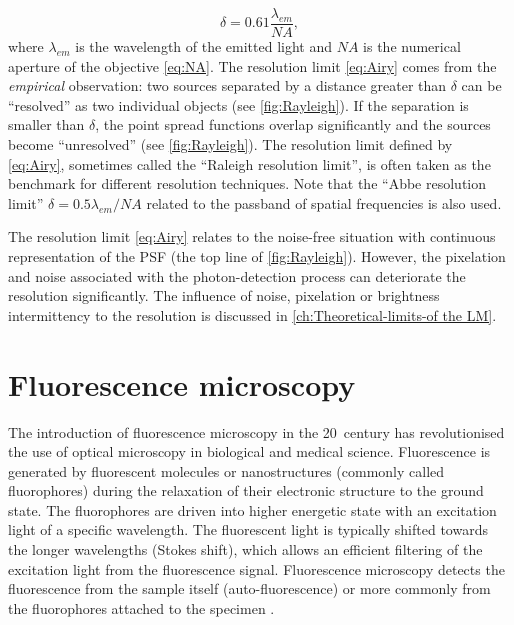 %
\begin{equation}
 	\delta=0.61\frac{\lambda_{em}}{\unit{NA}}, 
	\label{eq:Airy}
\end{equation}
%
where $\lambda_{em}$ is the wavelength of the emitted light and $\unit{NA}$ is the numerical aperture of the objective \autoref{eq:NA}. The resolution limit \autoref{eq:Airy} comes from the \emph{empirical} observation: two sources separated by a distance greater than $\delta$ can be ``resolved'' as two individual objects (see \autoref{fig:Rayleigh}\ccc). If the separation is smaller than $\delta$, the point spread functions overlap significantly and the sources become ``unresolved'' (see \autoref{fig:Rayleigh}\aaa). The resolution limit defined by \autoref{eq:Airy}, sometimes called  the ``Raleigh resolution limit'',  is often taken as the benchmark for different resolution techniques. Note that the ``Abbe resolution limit'' $\delta=0.5\lambda_{em}/\unit{NA}$ related to the passband of spatial frequencies is also used.

The resolution limit \autoref{eq:Airy} relates to the noise-free situation with continuous representation of the PSF (the top line of \autoref{fig:Rayleigh}). However, the pixelation and noise associated with the photon-detection process can deteriorate the resolution significantly. The influence of noise, pixelation or brightness intermittency to the resolution is discussed in \autoref{ch:Theoretical-limits-of the LM}. 


\section{Fluorescence microscopy\label{sec:Fluorescence microscopy}}

The introduction of fluorescence microscopy in the 20\ths\ century has revolutionised the use of optical microscopy in biological and medical science. Fluorescence is generated by fluorescent molecules or nanostructures (commonly called fluorophores) during the relaxation of their electronic structure to the ground state.  The fluorophores are driven into higher energetic state with an excitation light of a specific wavelength. The fluorescent light is typically shifted towards the longer wavelengths (Stokes shift),  which allows an efficient filtering of the excitation light from the fluorescence signal. Fluorescence microscopy detects the fluorescence from the sample itself (auto-fluorescence) or more commonly from the fluorophores attached to the specimen \cite{PawleyHandbook2006}.


